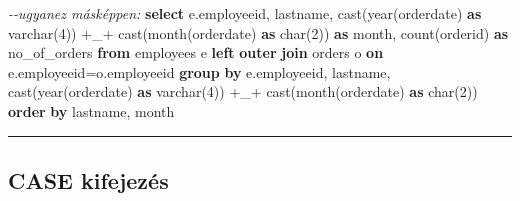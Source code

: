 \documentclass[
  magyar,
]{article}
\newenvironment{Shaded}{}{}
\newcommand{\CommentTok}[1]{\textcolor[rgb]{0.38,0.63,0.69}{\textit{#1}}}
\newcommand{\DataTypeTok}[1]{\textcolor[rgb]{0.56,0.13,0.00}{#1}}
\newcommand{\DecValTok}[1]{\textcolor[rgb]{0.25,0.63,0.44}{#1}}
\newcommand{\FunctionTok}[1]{\textcolor[rgb]{0.02,0.16,0.49}{#1}}
\newcommand{\KeywordTok}[1]{\textcolor[rgb]{0.00,0.44,0.13}{\textbf{#1}}}
\newcommand{\NormalTok}[1]{#1}
\newcommand{\OperatorTok}[1]{\textcolor[rgb]{0.40,0.40,0.40}{#1}}
\newcommand{\StringTok}[1]{\textcolor[rgb]{0.25,0.44,0.63}{#1}}
\begin{document}
\begin{Shaded}
\begin{Highlighting}[]
\CommentTok{{-}{-}ugyanez másképpen:}
\KeywordTok{select}\NormalTok{ e.employeeid, lastname,}
\FunctionTok{cast}\NormalTok{(}\DataTypeTok{year}\NormalTok{(orderdate) }\KeywordTok{as} \DataTypeTok{varchar}\NormalTok{(}\DecValTok{4}\NormalTok{)) }\OperatorTok{+}\StringTok{\textquotesingle{}\_\textquotesingle{}}\OperatorTok{+} \FunctionTok{cast}\NormalTok{(}\DataTypeTok{month}\NormalTok{(orderdate) }\KeywordTok{as} \DataTypeTok{char}\NormalTok{(}\DecValTok{2}\NormalTok{)) }\KeywordTok{as} \DataTypeTok{month}\NormalTok{,}
\FunctionTok{count}\NormalTok{(orderid) }\KeywordTok{as}\NormalTok{ no\_of\_orders}
\KeywordTok{from}\NormalTok{ employees e }\KeywordTok{left} \KeywordTok{outer} \KeywordTok{join}\NormalTok{ orders o }\KeywordTok{on}\NormalTok{ e.employeeid}\OperatorTok{=}\NormalTok{o.employeeid}
\KeywordTok{group} \KeywordTok{by}\NormalTok{ e.employeeid, lastname, }\FunctionTok{cast}\NormalTok{(}\DataTypeTok{year}\NormalTok{(orderdate) }\KeywordTok{as} \DataTypeTok{varchar}\NormalTok{(}\DecValTok{4}\NormalTok{)) }\OperatorTok{+}\StringTok{\textquotesingle{}\_\textquotesingle{}}\OperatorTok{+}
\FunctionTok{cast}\NormalTok{(}\DataTypeTok{month}\NormalTok{(orderdate) }\KeywordTok{as} \DataTypeTok{char}\NormalTok{(}\DecValTok{2}\NormalTok{))}
\KeywordTok{order} \KeywordTok{by}\NormalTok{ lastname, }\DataTypeTok{month}
\end{Highlighting}
\end{Shaded}

\begin{center}\rule{0.5\linewidth}{0.5pt}\end{center}

\subsection{CASE kifejezés}\label{case-kifejezuxe9s}
\end{document}
